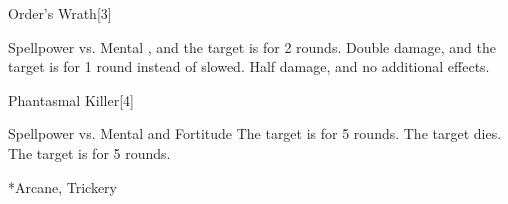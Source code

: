 
\begin{spellsection}{Order's Wrath}[3]
    \begin{spellheader}
    \end{spellheader}
    \begin{spellcontent}
        \begin{spelltargetinginfo}
        \end{spelltargetinginfo}
        \begin{spelleffects}
            \begin{spellattack}{Spellpower vs. Mental}
                \spellsuccess {}, and the target is \slowed for 2 rounds.
                \spellcritical Double damage, and the target is \stunned for 1 round instead of slowed.
                \spellfailure Half damage, and no additional effects.
            \end{spellattack}
        \end{spelleffects}
    \end{spellcontent}
    \begin{spellfooter}
        \miscastrandom
    \end{spellfooter}
\end{spellsection}

\begin{spellsection}{Phantasmal Killer}[4]
    \begin{spellheader}
    \end{spellheader}
    \begin{spellcontent}
        \begin{spelltargetinginfo}
        \end{spelltargetinginfo}
        \begin{spelleffects}
            \begin{spellattack}{Spellpower vs. Mental and Fortitude}
                \spellsuccess[Mental] The target is \frightened for 5 rounds.
                 The target dies.
                \spellfailure The target is \shaken for 5 rounds.
            \end{spellattack}
        \end{spelleffects}
    \end{spellcontent}
    \begin{spellfooter}
        *{Arcane, Trickery}
        \miscastrandom
    \end{spellfooter}
    \begin{spellaugments}
    \end{spellaugments}
\end{spellsection}

